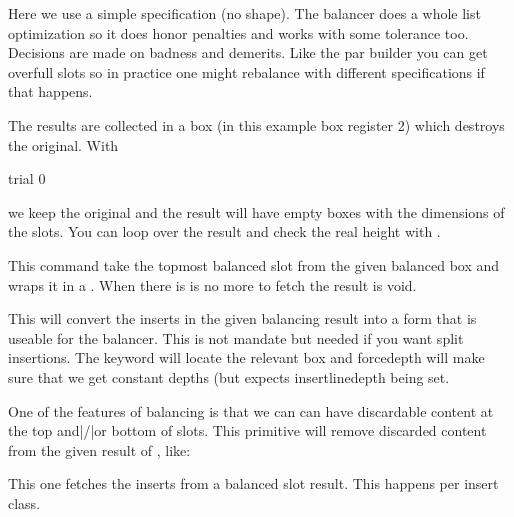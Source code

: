 \typebuffer

Here we use a simple specification (no shape). The balancer does a whole list
optimization so it does honor penalties and works with some tolerance too.
Decisions are made on badness and demerits. Like the par builder you can get
overfull slots so in practice one might rebalance with different specifications
if that happens.

The results are collected in a box (in this example box register 2) which destroys the
original. With

\starttyping
{} \vbalance trial 0
\stoptyping

we keep the original and the result will have empty boxes with the dimensions of
the slots. You can loop over the result and check the real height with \typ
{\balanceshapevsize}.

\getbuffer

\stopnewprimitive

\startnewprimitive[title={\prm {vbalancedbox}}]

This command take the topmost balanced slot from the given balanced box and wraps
it in a \type {\vbox}. When there is is no more to fetch the result is void.

\stopnewprimitive

\startnewprimitive[title={\prm {vbalanceddeinsert}}]

This will convert the inserts in the given balancing result into a form that is
useable for the balancer. This is not mandate but needed if you want split
insertions. The keyword  will locate the relevant box and \type
{forcedepth} will make sure that we get constant depths (but expects \prm
{insertlinedepth} being set.

\stopnewprimitive

\startnewprimitive[title={\prm {vbalanceddiscard}}]

One of the features of balancing is that we can can have discardable content at
the top and|/|or bottom of slots. This primitive will remove discarded content
from the given result of \type {\vbalance}, like:

\starttyping
{} 
\stoptyping

\stopnewprimitive

\startnewprimitive[title={\prm {vbalancedinsert}}]

This one fetches the inserts from a balanced slot result. This happens per insert
class.

